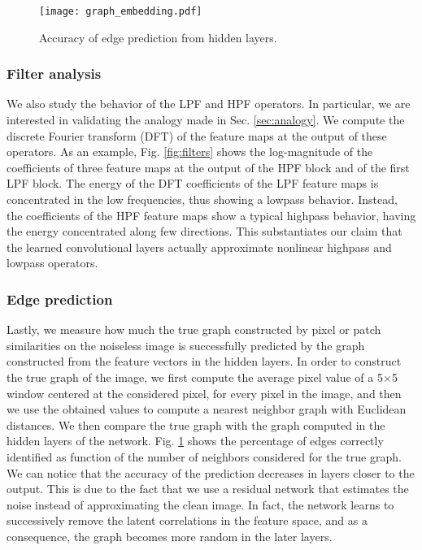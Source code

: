 \documentclass[journal]{IEEEtran}
\begin{document}
\begin{figure}
\centering
\texttt{[image: graph\_embedding.pdf]}
\caption{Accuracy of edge prediction from hidden layers.}
\label{fig:graph_embedding}
\end{figure}

\subsubsection{Filter analysis}
We also study the behavior of the LPF and HPF operators. In particular, we are interested in validating the analogy made in Sec. \ref{sec:analogy}. We compute the discrete Fourier transform (DFT) of the feature maps at the output of these operators. As an example, Fig. \ref{fig:filters} shows the log-magnitude of the coefficients of three feature maps at the output of the HPF block and of the first LPF block. The energy of the DFT coefficients of the LPF feature maps is concentrated in the low frequencies, thus showing a lowpass behavior. Instead, the coefficients of the HPF feature maps show a typical highpass behavior, having the energy concentrated along few directions.
This substantiates our claim that the learned convolutional layers actually approximate nonlinear highpass and lowpass operators.

\subsubsection{Edge prediction}
Lastly, we measure how much the true graph constructed by pixel or patch similarities on the noiseless image is successfully predicted by the graph constructed from the feature vectors in the hidden layers. In order to construct the true graph of the image, we first compute the average pixel value of a 5$\times$5 window centered at the considered pixel, for every pixel in the image, and then we use the obtained values to compute a nearest neighbor graph with Euclidean distances. We then compare the true graph with the graph computed in the hidden layers of the network. Fig. \ref{fig:graph_embedding} shows the percentage of edges correctly identified as function of the number of neighbors considered for the true graph. We can notice that the accuracy of the prediction decreases in layers closer to the output. This is due to the fact that we use a residual network that estimates the noise instead of approximating the clean image. In fact, the network learns to successively remove the latent correlations in the feature space, and as a consequence, the graph becomes more random in the later layers.
\end{document}
